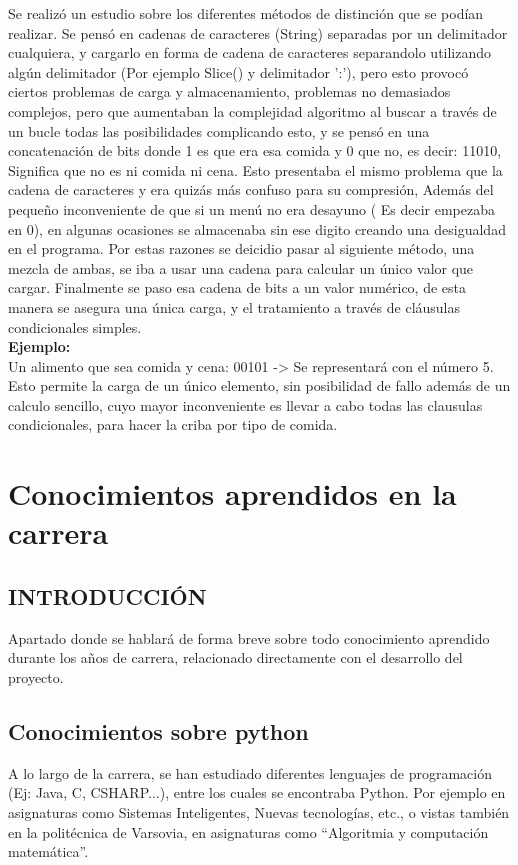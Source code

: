 Se realizó un estudio sobre los diferentes métodos de distinción que se podían realizar. Se pensó en  cadenas de caracteres (String) separadas por un delimitador cualquiera, y cargarlo en forma de cadena de caracteres separandolo utilizando algún delimitador (Por ejemplo Slice() y delimitador ':'), pero esto provocó ciertos problemas de carga y almacenamiento, problemas no demasiados complejos, pero que aumentaban la complejidad algoritmo al buscar a través de un bucle todas las posibilidades complicando esto, y se pensó en una concatenación de bits donde 1 es que era esa comida y 0 que no, es decir: 11010, Significa que no es ni comida ni cena. Esto presentaba el mismo problema que la cadena de caracteres y era quizás más confuso para su compresión, Además del pequeño inconveniente de que si un menú no era desayuno ( Es decir empezaba en 0), en algunas ocasiones se almacenaba sin ese digito creando una desigualdad en el programa. Por estas razones se deicidio pasar al siguiente método, una mezcla de ambas, se iba a usar una cadena para calcular un único valor que cargar. Finalmente se paso esa cadena de bits a un valor numérico, de esta manera se asegura una única carga, y el tratamiento a través de cláusulas condicionales simples.\\

\textbf{Ejemplo:}\\
Un alimento que sea comida y cena: 00101 -> Se representará con el número 5. \\
Esto permite la carga de un único elemento, sin posibilidad de fallo además de un calculo sencillo, cuyo mayor inconveniente es llevar a cabo todas las clausulas condicionales, para hacer la criba por tipo de comida.\\

\section{Conocimientos aprendidos en la carrera}
\subsection{INTRODUCCIÓN}
Apartado donde se hablará de forma breve sobre todo conocimiento aprendido durante los años de carrera, relacionado directamente con el desarrollo del proyecto.
\subsection{Conocimientos sobre python}
A lo largo de la carrera, se han estudiado diferentes lenguajes de programación (Ej: Java, C, CSHARP...), entre los cuales se encontraba Python. Por ejemplo en asignaturas como Sistemas Inteligentes, Nuevas tecnologías, etc., o vistas también en la  politécnica de Varsovia, en asignaturas como “Algoritmia y computación matemática”.\\

